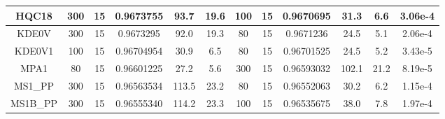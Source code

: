 \begin{table}[]
\begin{tabular}{@{}cccccccccccc@{}}
\multicolumn{1}{|c|}{HQC18}        & \multicolumn{1}{c|}{300}            & \multicolumn{1}{c|}{15}             & \multicolumn{1}{c|}{0.9673755}      & \multicolumn{1}{c|}{93.7}        & \multicolumn{1}{c|}{19.6}            & \multicolumn{1}{c|}{100}            & \multicolumn{1}{c|}{15}             & \multicolumn{1}{c|}{0.9670695}      & \multicolumn{1}{c|}{31.3}        & \multicolumn{1}{c|}{6.6}             & \multicolumn{1}{c|}{3.06e-4}         \\ \midrule
\multicolumn{1}{|c|}{KDE0V}        & \multicolumn{1}{c|}{300}            & \multicolumn{1}{c|}{15}             & \multicolumn{1}{c|}{0.9673295}      & \multicolumn{1}{c|}{92.0}        & \multicolumn{1}{c|}{19.3}            & \multicolumn{1}{c|}{80}             & \multicolumn{1}{c|}{15}             & \multicolumn{1}{c|}{0.9671236}      & \multicolumn{1}{c|}{24.5}        & \multicolumn{1}{c|}{5.1}             & \multicolumn{1}{c|}{2.06e-4}         \\ \midrule
\multicolumn{1}{|c|}{KDE0V1}       & \multicolumn{1}{c|}{100}            & \multicolumn{1}{c|}{15}             & \multicolumn{1}{c|}{0.96704954}     & \multicolumn{1}{c|}{30.9}        & \multicolumn{1}{c|}{6.5}             & \multicolumn{1}{c|}{80}             & \multicolumn{1}{c|}{15}             & \multicolumn{1}{c|}{0.96701525}     & \multicolumn{1}{c|}{24.5}        & \multicolumn{1}{c|}{5.2}             & \multicolumn{1}{c|}{3.43e-5}         \\ \midrule
\multicolumn{1}{|c|}{MPA1}         & \multicolumn{1}{c|}{80}             & \multicolumn{1}{c|}{15}             & \multicolumn{1}{c|}{0.96601225}     & \multicolumn{1}{c|}{27.2}        & \multicolumn{1}{c|}{5.6}             & \multicolumn{1}{c|}{300}            & \multicolumn{1}{c|}{15}             & \multicolumn{1}{c|}{0.96593032}     & \multicolumn{1}{c|}{102.1}       & \multicolumn{1}{c|}{21.2}            & \multicolumn{1}{c|}{8.19e-5}         \\ \midrule
\multicolumn{1}{|c|}{MS1\_PP}      & \multicolumn{1}{c|}{300}            & \multicolumn{1}{c|}{15}             & \multicolumn{1}{c|}{0.96563534}     & \multicolumn{1}{c|}{113.5}       & \multicolumn{1}{c|}{23.2}            & \multicolumn{1}{c|}{80}             & \multicolumn{1}{c|}{15}             & \multicolumn{1}{c|}{0.96552063}     & \multicolumn{1}{c|}{30.2}        & \multicolumn{1}{c|}{6.2}             & \multicolumn{1}{c|}{1.15e-4}         \\ \midrule
\multicolumn{1}{|c|}{MS1B\_PP}     & \multicolumn{1}{c|}{300}            & \multicolumn{1}{c|}{15}             & \multicolumn{1}{c|}{0.96555340}     & \multicolumn{1}{c|}{114.2}       & \multicolumn{1}{c|}{23.3}            & \multicolumn{1}{c|}{100}            & \multicolumn{1}{c|}{15}             & \multicolumn{1}{c|}{0.96535675}     & \multicolumn{1}{c|}{38.0}        & \multicolumn{1}{c|}{7.8}             & \multicolumn{1}{c|}{1.97e-4}         \\ \midrule

\end{tabular}
\end{table}
